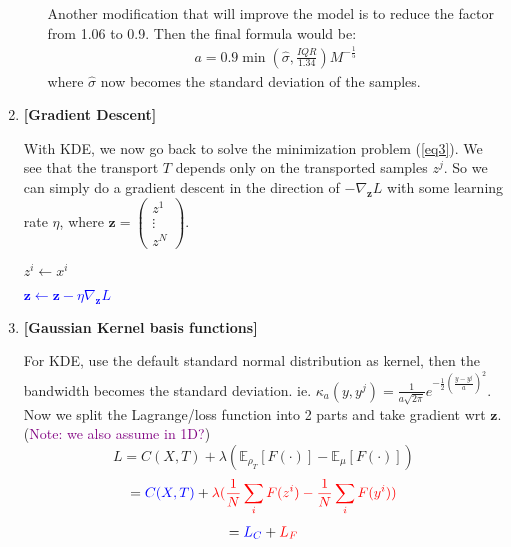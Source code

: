 \documentclass[11pt]{article}
\begin{document}
\begin{enumerate}
\begin{enumerate}
        Another modification that will improve the model is to reduce the factor from 1.06 to 0.9. Then the final formula would be:
        \begin{align*}
            a = 0.9 \min (\hat{\sigma}, \frac{IQR}{1.34}) M^{-\frac{1}{5}}
        \end{align*}
        where $\hat{\sigma}$ now becomes the standard deviation of the samples.
    \end{enumerate}
    
    \item {\bf [Gradient Descent]}
    
    With KDE, we now go back to solve the minimization problem (\ref{eq3}).
    We see that the transport $T$ depends only on the transported samples $z^j$. So we can simply do a gradient descent in the direction of $-\nabla_{\mathbf{z}} L$ with some learning rate $\eta$, where $\mathbf{z} = \begin{pmatrix}
    z^1 \\ \vdots \\ z^N
    \end{pmatrix}$.
    
        \begin{algorithm}[h]
        \caption{Gradient Descent w.r.t $\mathbf{z}$}
        \begin{algorithmic}
        \State $z^i \gets x^i$
        \EndFor
            
        \textcolor{blue}{\State $\mathbf{z} \gets \mathbf{z} - \eta \nabla_{\mathbf{z}} L$} 
        \EndWhile
            
        \end{algorithmic}
        \end{algorithm}
    
    \item {\bf [Gaussian Kernel basis functions]}
    
    For KDE, use the default standard normal distribution as kernel, then the bandwidth becomes the standard deviation.
    ie. $\kappa_a(y,y^j) = \frac{1}{a \sqrt{2\pi}} e^{-\frac{1}{2}(\frac{y-y^j}{a})^2}$. Now we split the Lagrange/loss function into 2 parts and take gradient wrt $\mathbf{z}$. (\textcolor{purple}{Note: we also assume in 1D?})
    $$
    L = C(X,T) + \lambda (\mathbb{E}_{\rho_{T}} [F(\cdot)] - \mathbb{E}_{\mu} [F(\cdot)])
    $$
    $$
    = \textcolor{blue}{C(X,T)} + \textcolor{red}{\lambda (\frac{1}{N} \sum_i F(z^i) - \frac{1}{N} \sum_i F(y^i))}
    $$
    \begin{align}
        = \textcolor{blue}{L_C} + \textcolor{red}{L_F}
    \end{align}
    

\end{enumerate}
\end{document}
